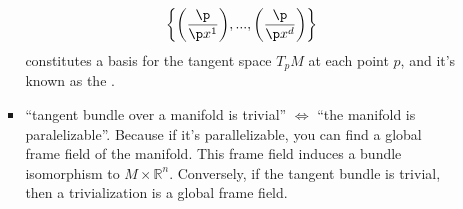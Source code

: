 \documentclass{article}
\begin{document}
\begin{enumerate}
\begin{itemize}
\begin{itemize}[$\circ$]
\begin{align*} 
        \bigg\{ \bigg(\frac{\p}{\p x^1}\bigg), ... , \bigg(\frac{\p}{\p x^d}\bigg)\bigg\}
    \end{align*} 
    constitutes a basis for the tangent space $T_pM$ at each point $p$, and it's known as the .
\item {}  ``tangent bundle over a manifold is trivial'' $\Leftrightarrow$ ``the manifold is paralelizable''. {\tiny Because if it's parallelizable, you can find a global frame field of the manifold. This frame field induces a bundle isomorphism to $M \times \mathbb{R}^n$. Conversely, if the tangent bundle is trivial, then a trivialization is a global frame field.}
\end{itemize}

\end{itemize}






\end{enumerate}
\end{document}
